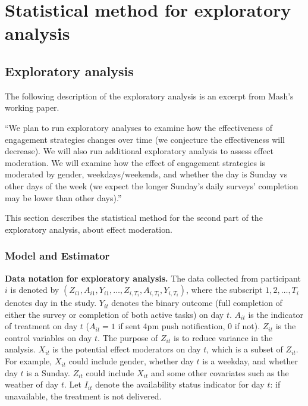 \documentclass[11pt]{article}
\begin{document}
\section{Statistical method for exploratory analysis}

\subsection{Exploratory analysis}

The following description of the exploratory analysis is an excerpt
from Mash's working paper.

``We plan to run exploratory analyses to examine how the effectiveness
of engagement strategies changes over time (we conjecture the effectiveness
will decrease). We will also run additional exploratory analysis to
assess effect moderation. We will examine how the effect of engagement
strategies is moderated by gender, weekdays/weekends, and whether
the day is Sunday vs other days of the week (we expect the longer
Sunday\textquoteright s daily surveys\textquoteright{} completion
may be lower than other days).''


This section describes the statistical method for the second part
of the exploratory analysis, about effect moderation.

\subsubsection{Model and Estimator}

\textbf{Data notation for exploratory analysis.} The data collected
from participant $i$ is denoted by $(Z_{i1},A_{i1},Y_{i1},\ldots,Z_{i,T_i},A_{i,T_i},Y_{i,T_i})$,
where the subscript $1,2,\ldots,T_i$ denotes day in the study. $Y_{it}$
denotes the binary outcome (full completion of either the survey or
completion of both active tasks) on day $t$. $A_{it}$ is the indicator
of treatment on day $t$ ($A_{it}=1$ if sent 4pm push notification,
0 if not). $Z_{it}$ is the control variables on day $t$. The purpose
of $Z_{it}$ is to reduce variance in the analysis. $X_{it}$ is the
potential effect moderators on day $t$, which is a subset of $Z_{it}$.
For example, $X_{it}$ could include gender, whether day $t$ is a
weekday, and whether day $t$ is a Sunday. $Z_{it}$ could include
$X_{it}$ and some other covariates such as the weather of day $t$. Let $I_{it}$ denote the availability status indicator for day $t$: if unavailable, the treatment is not delivered.
\end{document}
